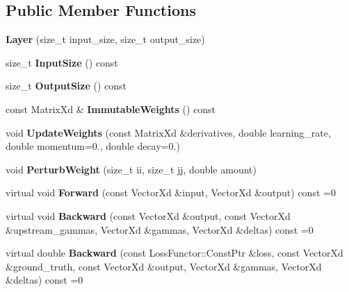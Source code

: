 \subsection*{Public Member Functions}
\begin{DoxyCompactItemize}
\item 
\hypertarget{classmininet_1_1_layer_aed25482510bfaf3ca2fbea9897ddb352}{}\label{classmininet_1_1_layer_aed25482510bfaf3ca2fbea9897ddb352} 
{\bfseries Layer} (size\+\_\+t input\+\_\+size, size\+\_\+t output\+\_\+size)
\item 
\hypertarget{classmininet_1_1_layer_a1e4d5bfdc7e78035d185e4a1a690d53b}{}\label{classmininet_1_1_layer_a1e4d5bfdc7e78035d185e4a1a690d53b} 
size\+\_\+t {\bfseries Input\+Size} () const
\item 
\hypertarget{classmininet_1_1_layer_a57a99b9937ce76a1a6e57903f308aba4}{}\label{classmininet_1_1_layer_a57a99b9937ce76a1a6e57903f308aba4} 
size\+\_\+t {\bfseries Output\+Size} () const
\item 
\hypertarget{classmininet_1_1_layer_a294ed3ba99229b383cf0486a5bbc67bb}{}\label{classmininet_1_1_layer_a294ed3ba99229b383cf0486a5bbc67bb} 
const Matrix\+Xd \& {\bfseries Immutable\+Weights} () const
\item 
\hypertarget{classmininet_1_1_layer_a2b45d5d75030e782f43ff46972d471f8}{}\label{classmininet_1_1_layer_a2b45d5d75030e782f43ff46972d471f8} 
void {\bfseries Update\+Weights} (const Matrix\+Xd \&derivatives, double learning\+\_\+rate, double momentum=0., double decay=0.)
\item 
\hypertarget{classmininet_1_1_layer_a20738f447572a1fa759decae8913814f}{}\label{classmininet_1_1_layer_a20738f447572a1fa759decae8913814f} 
void {\bfseries Perturb\+Weight} (size\+\_\+t ii, size\+\_\+t jj, double amount)
\item 
\hypertarget{classmininet_1_1_layer_a933df55c92eb813d3e69e9ecfa42dfa6}{}\label{classmininet_1_1_layer_a933df55c92eb813d3e69e9ecfa42dfa6} 
virtual void {\bfseries Forward} (const Vector\+Xd \&input, Vector\+Xd \&output) const =0
\item 
\hypertarget{classmininet_1_1_layer_adcb8e5bd70a76f479c9448def491576f}{}\label{classmininet_1_1_layer_adcb8e5bd70a76f479c9448def491576f} 
virtual void {\bfseries Backward} (const Vector\+Xd \&output, const Vector\+Xd \&upstream\+\_\+gammas, Vector\+Xd \&gammas, Vector\+Xd \&deltas) const =0
\item 
\hypertarget{classmininet_1_1_layer_a979f63fe1e0d4b907b6a7adb7767b75e}{}\label{classmininet_1_1_layer_a979f63fe1e0d4b907b6a7adb7767b75e} 
virtual double {\bfseries Backward} (const Loss\+Functor\+::\+Const\+Ptr \&loss, const Vector\+Xd \&ground\+\_\+truth, const Vector\+Xd \&output, Vector\+Xd \&gammas, Vector\+Xd \&deltas) const =0
\end{DoxyCompactItemize}
